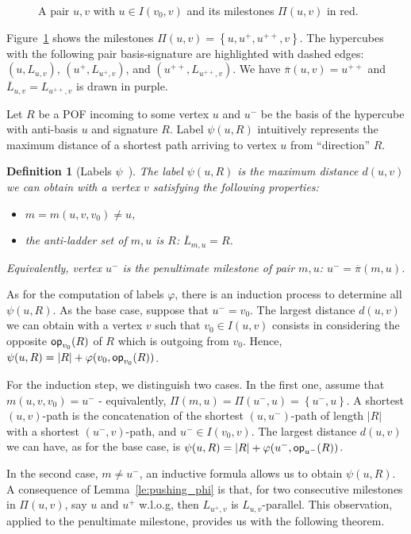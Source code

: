 \documentclass{article}
\newtheorem{definition}{Definition}
\newcommand{\set}[1]{\left\{ #1 \right\}}
\newcommand{\card}[1]{\left| #1 \right|}
\newcommand{\opp}{\mbox{\textsf{op}}}
\begin{document}
\begin{figure}[h]
\centering
\scalebox{0.9}{}
\caption{A pair $u,v$ with $u \in I(v_0,v)$ and its milestones $\Pi(u,v)$ in red.}
\label{fig:milestones}
\end{figure}

Figure~\ref{fig:milestones} shows the milestones $\Pi(u,v) = \set{u,u^+,u^{++},v}$. The hypercubes with the following pair basis-signature are highlighted with dashed edges: $(u,L_{u,v})$, $(u^+,L_{u^+,v})$, and $(u^{++},L_{u^{++},v})$. We have $\overline{\pi}(u,v) = u^{++}$ and $\overline{L}_{u,v} = L_{u^{++},v}$ is drawn in purple.

Let $R$ be a POF incoming to some vertex $u$ and $u^-$ be the basis of the hypercube with anti-basis $u$ and signature $R$.  Label $\psi(u,R)$ intuitively represents the maximum distance of a shortest path arriving to vertex $u$ from ``direction'' $R$. 

\begin{definition}[Labels $\psi$~\cite{BeHa21}]
The label $\psi(u,R)$ is the maximum distance $d(u,v)$ we can obtain with a vertex $v$ satisfying the following properties:
\begin{itemize}
\item $m = m(u,v,v_0) \neq u$,
\item the anti-ladder set of $m,u$ is $R$: $\overline{L}_{m,u} = R$.
\end{itemize}
Equivalently, vertex $u^-$ is the penultimate milestone of pair $m,u$: $u^- = \overline{\pi}(m,u)$.
\label{def:psi}
\end{definition}

As for the computation of labels $\varphi$, there is an induction process to determine all $\psi(u,R)$. As the base case, suppose that $u^- = v_0$. The largest distance $d(u,v)$ we can obtain with a vertex $v$ such that $v_0 \in I(u,v)$ consists in considering the opposite $\opp_{v_0}(R)$ of $R$ which is outgoing from $v_0$. Hence, $\psi(u,R) = \card{R} + \varphi(v_0,\opp_{v_0}(R))$.

For the induction step, we distinguish two cases. In the first one, assume that $m(u,v,v_0) = u^-$ - equivalently, $\Pi(m,u) = \Pi(u^-,u) = \set{u^-,u}$. A shortest $(u,v)$-path is the concatenation of the shortest $(u,u^-)$-path of length $\card{R}$ with a shortest $(u^-,v)$-path, and $u^- \in I(v_0,v)$. The largest distance $d(u,v)$ we can have, as for the base case, is $\psi(u,R) = \card{R} + \varphi(u^-,\opp_{u^-}(R))$.

In the second case, $m \neq u^-$, an inductive formula allows us to obtain $\psi(u,R)$. A consequence of Lemma~\ref{le:pushing_phi} is that, for two consecutive milestones in $\Pi(u,v)$, say $u$ and $u^+$ w.l.o.g, then $L_{u^+,v}$ is $L_{u,v}$-parallel. This observation, applied to the penultimate milestone, provides us with the following theorem.
\end{document}
